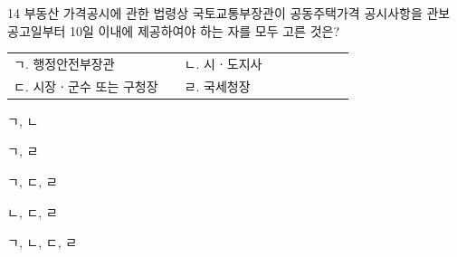 \begin{question}{14}
부동산 가격공시에 관한 법령상 국토교통부장관이 공동주택가격 공시사항을 관보 공고일부터 10일 이내에 제공하여야 하는 자를 모두 고른 것은?
\begin{framedtext}
\begin{tabular}{@{}p{0.46\linewidth}p{0.46\linewidth}@{}}
ㄱ. 행정안전부장관 & ㄴ. 시ㆍ도지사 \\
ㄷ. 시장ㆍ군수 또는 구청장 & ㄹ. 국세청장
\end{tabular}
\end{framedtext}
\begin{choices}
  \item ㄱ, ㄴ
  \item ㄱ, ㄹ
  \item ㄱ, ㄷ, ㄹ
  \item ㄴ, ㄷ, ㄹ
  \item ㄱ, ㄴ, ㄷ, ㄹ
\end{choices}
\end{question}
